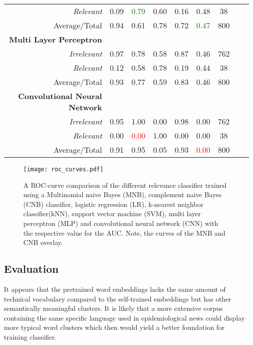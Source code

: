 \begin{table}
\begin{tabular}{@{}rcccccccc@{}}
      \textsl{Relevant}& 0.09& \textcolor{green}{0.79}&  0.60& 0.16& 0.48& 38 \\
      Average/Total& 0.94& 0.61& 0.78& 0.72& \textcolor{green}{0.47}& 800 \vspace{2mm}\\
      \textbf{Multi Layer Perceptron}\\
      \textsl{Irrelevant}& 0.97& 0.78&  0.58& 0.87& 0.46& 762 \\
      \textsl{Relevant}& 0.12& 0.58&  0.78& 0.19& 0.44& 38 \\
      Average/Total& 0.93& 0.77& 0.59& 0.83& 0.46& 800 \\
      \textbf{Convolutional Neural Network}\\
      \textsl{Irrelevant}& 0.95& 1.00&  0.00& 0.98& 0.00& 762 \\
      \textsl{Relevant}& 0.00& \textcolor{red}{0.00}&  1.00& 0.00& 0.00& 38 \\
      Average/Total& 0.91& 0.95& 0.05& 0.93& \textcolor{red}{0.00}& 800 \\
      \bottomrule
    \end{tabular}
  \label{table:recommender_performance}
  \end{table}

  \begin{figure}
    \centering
    \texttt{[image: roc\_curves.pdf]}
    \caption{A ROC-curve comparison of the different relevance classifier trained using a Multinomial naive Bayes (MNB), complement naive Bayes (CNB) classifier, logistic regression (LR), k-nearest neighbor classifier(kNN), support vector machine (SVM), multi layer perceptron (MLP) and convolutional neural network (CNN) with the respective value for the AUC. Note, the curves of the MNB and CNB overlay.}
  \label{fig:roc}
  \end{figure}

\subsection{Evaluation}
  It appears that the pretrained word embeddings lacks the same amount of technical vocabulary compared to the self-trained embeddings but has other semantically meaningful clusters.
  It is likely that a more extensive corpus containing the same specific language used in epidemiological news could display more typical word clusters which then would yield a better foundation for training classifier.


